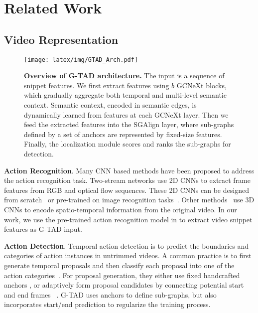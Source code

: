 \documentclass[10pt,twocolumn,letterpaper]{article}
\begin{document}
 \section{Related Work}
\subsection{Video Representation}
\begin{figure*}
    \centering
    \texttt{[image: latex/img/GTAD\_Arch.pdf]}
    \caption{\textbf{Overview of G-TAD architecture.} The input is a sequence of snippet features. We first extract features using $b$ GCNeXt blocks, which gradually aggregate both temporal and multi-level semantic context. Semantic context, encoded in semantic edges, is dynamically learned from features at each GCNeXt layer. 
   Then we feed the extracted features into the  SGAlign layer, where sub-graphs defined by a set of anchors are represented by fixed-size features. 
Finally, the localization module scores and ranks the sub-graphs for detection. 
}
    \label{fig:arch}
\end{figure*}

\noindent \textbf{Action Recognition}. Many CNN based methods have been proposed to address the action recognition task. Two-stream networks \cite{feichtenhofer2016convolutional,simonyan2014two,wang2015towards} use 2D CNNs to extract frame features from RGB and optical flow sequences.  
These 2D CNNs can be designed from scratch~\cite{he2016deep, simonyan2014very} or pre-trained on image recognition tasks~\cite{deng2009imagenet}. Other methods~\cite{tran2015learning,carreira2017quo,qiu2017learning,xu2017r} use 3D CNNs to encode spatio-temporal information from the original video. In our work, we use the pre-trained action recognition model in \cite{xiong2016cuhk,wang2016temporal} to extract video snippet features as G-TAD input.





\noindent \textbf{Action Detection}. Temporal action detection is to predict the boundaries and categories of action instances  in untrimmed videos. A common practice is to first generate temporal proposals and then classify each proposal into one of the action categories~\cite{shou2016temporal,singh2016untrimmed,zhao2017temporal, zeng2019graph, chao2018rethinking, lin2018bsn}.
For proposal generation, they either use fixed handcrafted anchors \cite{buch2017sst,caba2016fast, escorcia2016daps, gao2017turn,shou2016temporal} , or adaptively form proposal candidates by connecting potential start and end frames
~\cite{zhao2017temporal,lin2018bsn}. 
G-TAD uses anchors to define sub-graphs, but also incorporates start/end prediction to regularize the training process. 
\end{document}
